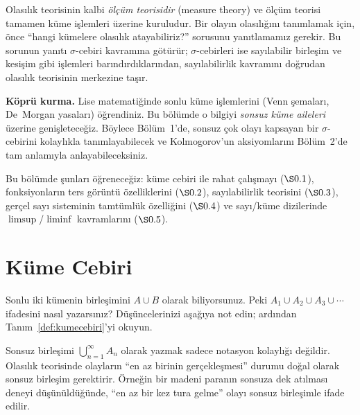 \begin{motivasyon}
Olasılık teorisinin kalbi \emph{ölçüm teorisidir} (measure theory) ve ölçüm
teorisi tamamen küme işlemleri üzerine kuruludur. Bir olayın olasılığını
tanımlamak için, önce ``hangi kümelere olasılık atayabiliriz?'' sorusunu
yanıtlamamız gerekir. Bu sorunun yanıtı $\sigma$-cebiri kavramına götürür;
$\sigma$-cebirleri ise sayılabilir birleşim ve kesişim gibi işlemleri
barındırdıklarından, sayılabilirlik kavramını doğrudan olasılık teorisinin
merkezine taşır.

\medskip

\textbf{Köprü kurma.} Lise matematiğinde sonlu küme işlemlerini (Venn
şemaları, De~Morgan yasaları) öğrendiniz. Bu bölümde o bilgiyi \emph{sonsuz
küme aileleri} üzerine genişleteceğiz. Böylece Bölüm~1'de, sonsuz çok olayı
kapsayan bir $\sigma$-cebirini kolaylıkla tanımlayabilecek ve Kolmogorov'un
aksiyomlarını Bölüm~2'de tam anlamıyla anlayabileceksiniz.

\medskip

Bu bölümde şunları öğreneceğiz:
küme cebiri ile rahat çalışmayı ($\S0.1$),
fonksiyonların ters görüntü özelliklerini ($\S0.2$),
sayılabilirlik teorisini ($\S0.3$),
gerçel sayı sisteminin tamtümlük özelliğini ($\S0.4$)
ve sayı/küme dizilerinde $\limsup$/$\liminf$ kavramlarını ($\S0.5$).
\end{motivasyon}


\section{Küme Cebiri}

\begin{kesif}
Sonlu iki kümenin birleşimini $A \cup B$ olarak biliyorsunuz. Peki
$A_1 \cup A_2 \cup A_3 \cup \cdots$ ifadesini nasıl yazarsınız?
Düşüncelerinizi aşağıya not edin; ardından Tanım~\ref{def:kumecebiri}'yi
okuyun.
\end{kesif}

\begin{tanimgerekce}
Sonsuz birleşimi $\bigcup_{n=1}^\infty A_n$ olarak yazmak sadece notasyon
kolaylığı değildir. Olasılık teorisinde olayların ``en az birinin gerçekleşmesi''
durumu doğal olarak sonsuz birleşim gerektirir. Örneğin bir madeni paranın
sonsuza dek atılması deneyi düşünüldüğünde, ``en az bir kez tura gelme'' olayı
sonsuz birleşimle ifade edilir.
\end{tanimgerekce}

